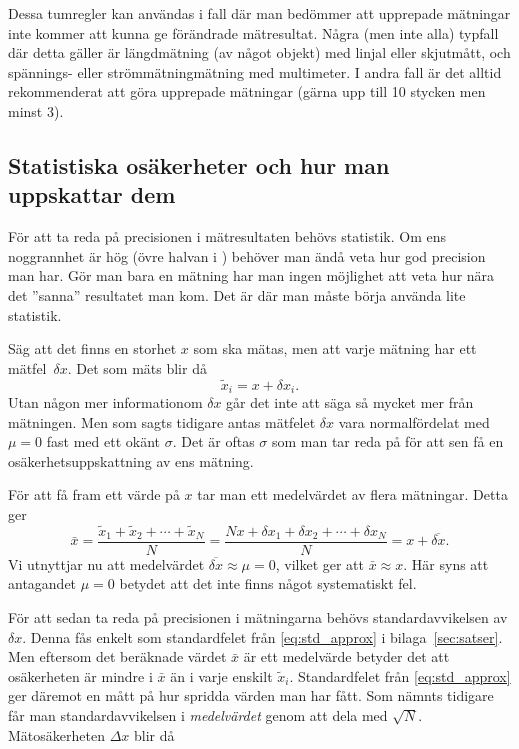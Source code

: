 \documentclass[11pt,a4paper, swedish
]{article}
\begin{document}
Dessa tumregler kan användas i fall där man bedömmer att upprepade
mätningar inte kommer att kunna ge förändrade mätresultat. Några (men
inte alla) typfall där detta gäller är längdmätning (av något objekt)
med linjal eller skjutmått, och spännings- eller strömmätningmätning
med multimeter. I andra fall är det alltid rekommenderat att göra
upprepade mätningar (gärna upp till 10 stycken men minst 3). 


\subsection{Statistiska osäkerheter och hur man uppskattar dem}
För att ta reda på precisionen i mätresultaten behövs statistik. Om
ens noggrannhet är hög (övre halvan i ) behöver
man ändå veta hur god precision man har. Gör man bara en mätning har
man ingen möjlighet att veta hur nära det ''sanna'' resultatet man
kom. Det är där man måste börja använda lite statistik. 

Säg att det finns en storhet $x$ som ska mätas, men att varje mätning
har ett mätfel~$\delta{x}$. Det som mäts blir då
\begin{equation}
\widetilde{x}_i=x+\delta{x}_i.
\end{equation}
Utan någon mer informationom $\delta{x}$ går det inte att säga så mycket mer
från mätningen. Men som sagts tidigare antas mätfelet $\delta{x}$ vara
normalfördelat med $\mu=0$ fast med ett okänt $\sigma$. Det är oftas
$\sigma$ som man tar reda på för att sen få en osäkerhetsuppskattning av
ens mätning. 

För att få fram ett värde på $x$ tar man ett medelvärdet av flera
mätningar. Detta ger
\begin{equation}
\bar{x}=\frac{\widetilde{x}_1+\widetilde{x}_2 + \cdots + \widetilde{x}_N}{N} 
= \frac{Nx+\delta{x}_1+\delta{x}_2 + \cdots + \delta{x}_N}{N}
= x + \overline{\delta{x}}.
\end{equation}
Vi utnyttjar nu att medelvärdet
$\overline{\delta{x}}\approx\mu=0$, vilket ger att $\bar{x}\approx x$.
Här syns att antagandet $\mu=0$ betydet att det inte finns något
systematiskt fel.

För att sedan ta reda på precisionen i mätningarna behövs
standardavvikelsen av $\delta{x}$. Denna fås enkelt som standardfelet
från \eqref{eq:std_approx} i bilaga~\ref{sec:satser}. Men eftersom det
beräknade värdet $\bar{x}$ är ett medelvärde betyder det att
osäkerheten är mindre i $\bar{x}$ än i varje enskilt
$\widetilde{x}_i$. Standardfelet från \eqref{eq:std_approx} ger
däremot en mått på hur spridda värden man har fått. Som nämnts
tidigare får man standardavvikelsen i \emph{medelvärdet} genom att
dela med $\sqrt{N}$. Mätosäkerheten\footnotemark{} $\Delta{x}$ blir då
\end{document}
